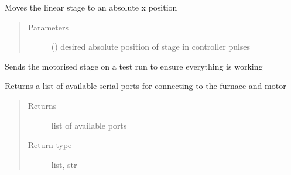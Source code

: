 \documentclass[letterpaper,10pt,english]{sphinxmanual}
\begin{document}
\begin{fulllineitems}

\begin{fulllineitems}
\label{\detokenize{drivers:drivers.Motor.set_xpos}}
Moves the linear stage to an absolute x position
\begin{quote}\begin{description}
\item[{Parameters}] \leavevmode
{} (\sphinxstyleliteralemphasis{\sphinxupquote{, }}) \textendash{} desired absolute position of stage in controller pulses

\end{description}\end{quote}

\end{fulllineitems}


\begin{fulllineitems}
\label{\detokenize{drivers:drivers.Motor.test}}
Sends the motorised stage on a test run to ensure everything is working

\end{fulllineitems}


\end{fulllineitems}


\begin{fulllineitems}
\label{\detokenize{drivers:drivers.get_ports}}
Returns a list of available serial ports for connecting to the furnace and motor
\begin{quote}\begin{description}
\item[{Returns}] \leavevmode
list of available ports

\item[{Return type}] \leavevmode
list, str

\end{description}\end{quote}

\end{fulllineitems}
\end{document}
